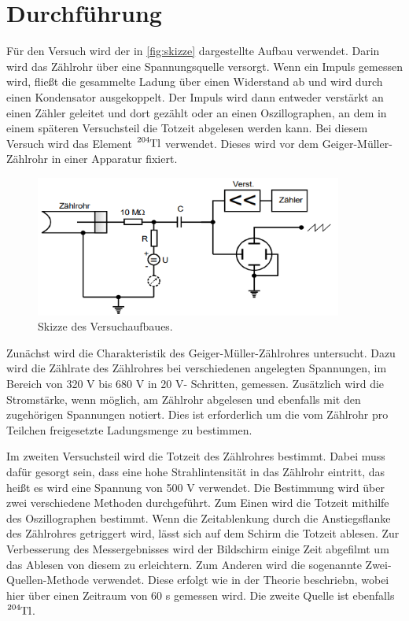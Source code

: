 \section{Durchführung}
\label{sec:Durchführung}
Für den Versuch wird der in \autoref{fig:skizze} dargestellte Aufbau verwendet. Darin wird das Zählrohr über eine Spannungsquelle
versorgt. Wenn ein Impuls gemessen wird, fließt die gesammelte Ladung über einen Widerstand ab und wird durch einen Kondensator
ausgekoppelt. Der Impuls wird dann entweder verstärkt an einen Zähler geleitet und dort gezählt oder an einen Oszillographen, an dem
in einem späteren Versuchsteil die Totzeit abgelesen werden kann. Bei diesem Versuch wird das Element $\ce{^{204}Tl}$ verwendet. Dieses
wird vor dem Geiger-Müller-Zählrohr in einer Apparatur fixiert.
\begin{figure}
    \centering
    \includegraphics[width=0.9\textwidth]{content/skizze.png}
    \caption{Skizze des Versuchaufbaues.}
    \label{fig:skizze}
\end{figure}

Zunächst wird die Charakteristik des Geiger-Müller-Zählrohres untersucht. Dazu wird die Zählrate des Zählrohres bei verschiedenen
angelegten Spannungen, im Bereich von 320 V bis 680 V in 20 V- Schritten, gemessen. Zusätzlich wird die Stromstärke, wenn möglich, am
Zählrohr abgelesen und ebenfalls mit den zugehörigen Spannungen notiert. Dies ist erforderlich um die vom Zählrohr pro Teilchen
freigesetzte Ladungsmenge zu bestimmen.

Im zweiten Versuchsteil wird die Totzeit des Zählrohres bestimmt. Dabei muss dafür gesorgt sein, dass eine
hohe Strahlintensität in das Zählrohr eintritt, das heißt es wird eine Spannung von 500 V verwendet.
Die Bestimmung wird über zwei verschiedene Methoden durchgeführt. 
Zum Einen wird die Totzeit mithilfe des Oszillographen bestimmt. Wenn die Zeitablenkung durch die Anstiegsflanke des Zählrohres
getriggert wird, lässt sich auf dem Schirm die Totzeit ablesen. Zur Verbesserung des Messergebnisses wird der Bildschirm einige Zeit
abgefilmt um das Ablesen von diesem zu erleichtern. Zum Anderen wird die sogenannte Zwei-Quellen-Methode verwendet. Diese erfolgt wie
in der Theorie beschriebn, wobei hier 
über einen Zeitraum von 60 s gemessen wird. Die zweite Quelle ist ebenfalls $\ce{^{204}Tl}$.

